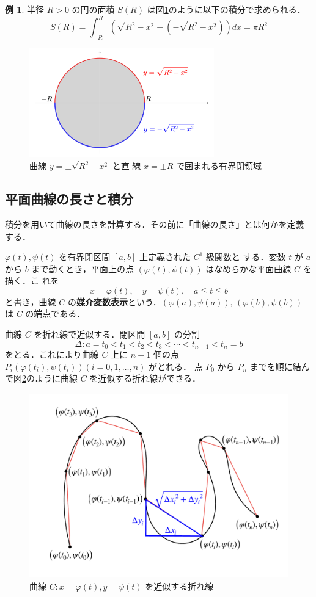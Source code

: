 \documentclass[10pt, uplatex, dvipdfmx]{jsarticle}
\theoremstyle{definition}
\newtheorem{example}[theorem]{例}
\numberwithin{equation}{section}
\begin{document}
\begin{example}
  半径 $R>0$ の円の面積 $S(R)$ は図\ref{fig:circle}のように以下の積分で求められる．
  \[
    S(R) =\int_{-R}^{R} \left( \sqrt{R^2-x^2} - \left(-\sqrt{R^2-x^2}\right) \right) dx = \pi R^2
  \]
  \begin{figure}[h]
    \centering
    \includegraphics[width=8cm]{./pictures/05/circle.pdf}
    \caption{曲線 $y=\pm \sqrt{R^2-x^2}$ と直
      線 $x= \pm R$ で囲まれる有界閉領域}
    \label{fig:circle}
  \end{figure}
\end{example}



\subsection{平面曲線の長さと積分}

積分を用いて曲線の長さを計算する．その前に「曲線の長さ」とは何かを定義
する．

$\varphi(t), \psi(t)$ を有界閉区間 $[a,b]$ 上定義された $C^1$ 級関数と
する．変数 $t$ が $a$ から $b$ まで動くとき，平面上の点
$\left( \varphi(t), \psi(t)\right)$ はなめらかな平面曲線 $C$ を描く．こ
れを
\[
  x=\varphi(t), \quad y=\psi(t), \quad a \leqq t \leqq b
\]
と書き，曲線 $C$
の\textbf{媒介変数表示}という．$\left( \varphi(a), \psi(a)\right), \,
\left(\varphi(b), \psi(b)\right)$ は $C$ の端点である．

曲線 $C$ を折れ線で近似する．閉区間 $[a,b]$ の分割
\[
  \Delta : a =t_0 < t_1 < t_2 < t_3< \cdots < t_{n-1} < t_n = b
\]
をとる．これにより曲線 $C$ 上に $n+1$ 個の点
$P_i\left( \varphi(t_i), \psi(t_i)\right) (i=0,1,\ldots, n)$ がとれる．
点 $P_0$ から $P_n$ までを順に結んで図\ref{fig:curve}のように曲線 $C$
を近似する折れ線ができる．
\begin{figure}[h]
  \centering
  \includegraphics[height=8cm]{./pictures/05/curve.pdf}
  \caption{曲線 $C : x=\varphi(t), y=\psi(t)$ を近似する折れ線}
  \label{fig:curve}
\end{figure}
\end{document}
